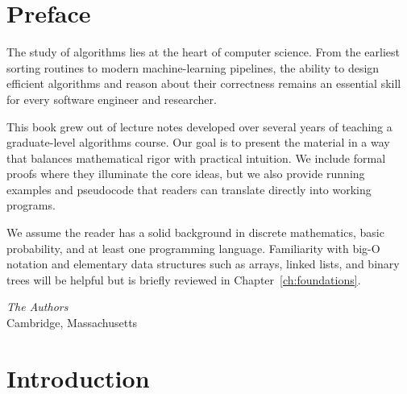\documentclass[
    language=english,
    doctype=book,
    institution=none,
    titlestyle=book
]{../../omnilatex}
\begin{document}
\frontmatter
\maketitle

\begin{abstract}
This book provides a comprehensive introduction to the design and analysis of algorithms, covering fundamental data structures, graph algorithms, dynamic programming, and computational complexity. Each chapter includes worked examples and exercises suitable for advanced undergraduate or introductory graduate courses in computer science.
\end{abstract}

\tableofcontents

\chapter*{Preface}

The study of algorithms lies at the heart of computer science. From the earliest sorting routines to modern machine-learning pipelines, the ability to design efficient algorithms and reason about their correctness remains an essential skill for every software engineer and researcher.

This book grew out of lecture notes developed over several years of teaching a graduate-level algorithms course. Our goal is to present the material in a way that balances mathematical rigor with practical intuition. We include formal proofs where they illuminate the core ideas, but we also provide running examples and pseudocode that readers can translate directly into working programs.

We assume the reader has a solid background in discrete mathematics, basic probability, and at least one programming language. Familiarity with big-O notation and elementary data structures such as arrays, linked lists, and binary trees will be helpful but is briefly reviewed in Chapter~\ref{ch:foundations}.

\vspace{1em}
\noindent\textit{The Authors}\\
\noindent Cambridge, Massachusetts

\mainmatter

\chapter{Introduction}\label{ch:introduction}
\end{document}
